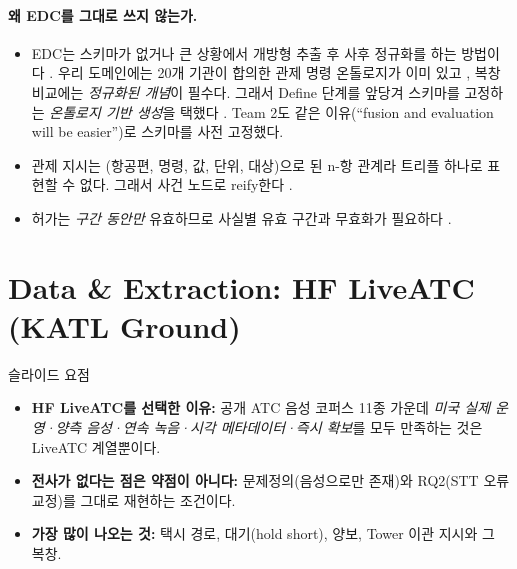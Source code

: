\documentclass[10pt,a4paper]{article}
\begin{document}
\paragraph{왜 EDC를 그대로 쓰지 않는가.}
\begin{itemize}
\item EDC는 스키마가 없거나 큰 상황에서 개방형 추출 후 사후 정규화를 하는 방법이다 \cite{edc2024}. 우리 도메인에는 20개 기관이 합의한 관제 명령 온톨로지가 이미 있고 \cite{helmke2018,kleinert2021}, 복창 비교에는 \emph{정규화된 개념}이 필수다. 그래서 Define 단계를 앞당겨 스키마를 고정하는 \emph{온톨로지 기반 생성}을 택했다 \cite{feng2024,llmkgc2025}. Team 2도 같은 이유(``fusion and evaluation will be easier'')로 스키마를 사전 고정했다.
\item 관제 지시는 (항공편, 명령, 값, 단위, 대상)으로 된 n-항 관계라 트리플 하나로 표현할 수 없다. 그래서 사건 노드로 reify한다 \cite{naryw3c,knez2023}.
\item 허가는 \emph{구간 동안만} 유효하므로 사실별 유효 구간과 무효화가 필요하다 \cite{zep2025,atom2025}.
\end{itemize}

\section{Data \& Extraction: HF LiveATC (KATL Ground)}\label{sec:data}
\begin{keybox}{슬라이드 요점}
\begin{itemize}[leftmargin=12pt]
\item \textbf{HF LiveATC를 선택한 이유:} 공개 ATC 음성 코퍼스 11종 가운데 \emph{미국 실제 운영·양측 음성·연속 녹음·시각 메타데이터·즉시 확보}를 모두 만족하는 것은 LiveATC 계열뿐이다.
\item \textbf{전사가 없다는 점은 약점이 아니다:} 문제정의(음성으로만 존재)와 RQ2(STT 오류 교정)를 그대로 재현하는 조건이다.
\item \textbf{가장 많이 나오는 것:} 택시 경로, 대기(hold short), 양보, Tower 이관 지시와 그 복창.
\end{itemize}
\end{keybox}
\end{document}
